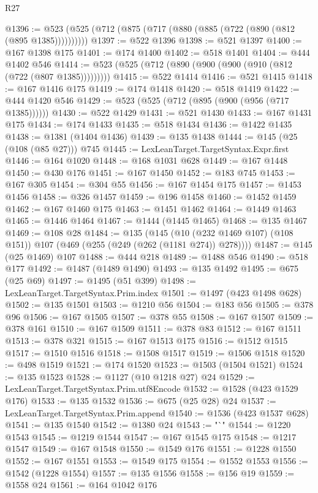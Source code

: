 \begin{lexlean}{R27}
\begin{coremodule}
@1396 := @523 (@525 (@712 (@875 (@717 (@880 (@885 (@722 (@890 (@812 (@895 @1385))))))))))
@1397 := @522 @1396
@1398 := @521 @1397
@1400 := @167 @1398 @175
@1401 := @174 @1400
@1402 := @518 @1401
@1404 := @444 @1402 @546
@1414 := @523 (@525 (@712 (@890 (@900 (@900 (@910 (@812 (@722 (@807 @1385)))))))))
@1415 := @522 @1414
@1416 := @521 @1415
@1418 := @167 @1416 @175
@1419 := @174 @1418
@1420 := @518 @1419
@1422 := @444 @1420 @546
@1429 := @523 (@525 (@712 (@895 (@900 (@956 (@717 @1385))))))
@1430 := @522 @1429
@1431 := @521 @1430
@1433 := @167 @1431 @175
@1434 := @174 @1433
@1435 := @518 @1434
@1436 := @1422 @1435
@1438 := @1381 (@1404 @1436)
@1439 := @135 @1438
@1444 := @145 (@25 (@108 (@85 @27))) @745
@1445 := LexLeanTarget.TargetSyntax.Expr.first
@1446 := @164 @1020
@1448 := @168 @1031 @628
@1449 := @167 @1448
@1450 := @430 @176
@1451 := @167 @1450
@1452 := @183 @745
@1453 := @167 @305
@1454 := @304 @55
@1456 := @167 @1454 @175
@1457 := @1453 @1456
@1458 := @326 @1457
@1459 := @196 @1458
@1460 := @1452 @1459
@1462 := @167 @1460 @175
@1463 := @1451 @1462
@1464 := @1449 @1463
@1465 := @1446 @1464
@1467 := @1444 (@1445 @1465)
@1468 := @135 @1467
@1469 := @108 @28
@1484 := @135
    (@145 (@10 (@232 @1469 @107) (@108 @151)) @107 (@469 (@255 (@249 (@262 (@1181 @274)) @278))))
@1487 := @145 (@25 @1469) @107
@1488 := @444 @218
@1489 := @1488 @546
@1490 := @518 @177
@1492 := @1487 (@1489 @1490)
@1493 := @135 @1492
@1495 := @675 (@25 @69)
@1497 := @1495 (@51 @399)
@1498 := LexLeanTarget.TargetSyntax.Prim.index
@1501 := @1497 (@423 @1498 @628)
@1502 := @135 @1501
@1503 := @1210 @56
@1504 := @183 @56
@1505 := @378 @96
@1506 := @167 @1505
@1507 := @378 @55
@1508 := @167 @1507
@1509 := @378 @161
@1510 := @167 @1509
@1511 := @378 @83
@1512 := @167 @1511
@1513 := @378 @321
@1515 := @167 @1513 @175
@1516 := @1512 @1515
@1517 := @1510 @1516
@1518 := @1508 @1517
@1519 := @1506 @1518
@1520 := @498 @1519
@1521 := @174 @1520
@1523 := @1503 (@1504 @1521)
@1524 := @135 @1523
@1528 := @1127 (@10 @1218 @27) @24
@1529 := LexLeanTarget.TargetSyntax.Prim.utf8Encode
@1532 := @1528 (@423 @1529 @176)
@1533 := @135 @1532
@1536 := @675 (@25 @28) @24
@1537 := LexLeanTarget.TargetSyntax.Prim.append
@1540 := @1536 (@423 @1537 @628)
@1541 := @135 @1540
@1542 := @1380 @24
@1543 := "`"
@1544 := @1220 @1543
@1545 := @1219 @1544
@1547 := @167 @1545 @175
@1548 := @1217 @1547
@1549 := @167 @1548
@1550 := @1549 @176
@1551 := @1228 @1550
@1552 := @167 @1551
@1553 := @1549 @175
@1554 := @1552 @1553
@1556 := @1542 (@1228 @1554)
@1557 := @135 @1556
@1558 := @156 @19
@1559 := @1558 @24
@1561 := @164 @1042 @176

\end{coremodule}
\end{lexlean}
